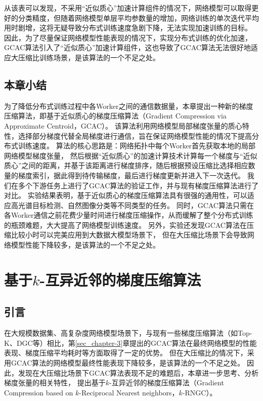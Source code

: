 \documentclass{xdupgthesis}
\begin{document}
从该表可以发现，不采用“近似质心”加速计算组件的情况下，网络模型可以取得更好的分类精度，但随着网络模型单层平均参数量的增加，网络训练的单次迭代平均用时剧增，这将无疑导致分布式训练速度急剧下降，无法实现加速训练的目标。
因此，为了尽量保证网络模型性能表现的情况下，实现分布式训练的优化加速，GCAC算法引入了“近似质心”加速计算组件，这也导致了GCAC算法无法很好地适应大压缩比训练场景，是该算法的一个不足之处。


\section{本章小结}
\label{sec_Summary-3}
为了降低分布式训练过程中各Worker之间的通信数据量，本章提出一种新的梯度压缩算法，即基于近似质心的梯度压缩算法（Gradient Compression via Approximate Centroid，GCAC）。
该算法利用网络模型局部梯度张量的质心特性，选择部分梯度代替全局梯度进行通信，旨在保证网络模型性能的情况下提高分布式训练速度。
算法的核心思路是：网络拓扑中每个Worker首先获取本地的局部网络模型梯度张量，
然后根据“近似质心”的加速计算技术计算每一个梯度与“近似质心”之间的距离，并基于该距离进行梯度排序，随后根据预设压缩比选择相应数量的梯度索引，据此得到待传输梯度，最后进行梯度更新并进入下一次迭代。
我们在多个下游任务上进行了GCAC算法的验证工作，并与现有梯度压缩算法进行了对比。
实验结果表明，基于近似质心的梯度压缩算法具有很强的通用性，可以适应高光谱目标检测、自然图像分类等不同类型的任务。
同时，GCAC算法只需在各Worker通信之前花费少量时间进行梯度压缩操作，从而缓解了整个分布式训练的瓶颈难题，大大提高了网络模型训练速度。
另外，实验还发现GCAC算法在压缩比较小时可以完美应用到大数据大模型场景下，
但在大压缩比场景下会导致网络模型性能下降较多，是该算法的一个不足之处。



\chapter{基于\texorpdfstring{$k$}.-互异近邻的梯度压缩算法}
\section{引言}
在大规模数据集、高复杂度网络模型场景下，与现有一些梯度压缩算法（如Top-K、DGC等）相比，第\ref{sec_chapter-3}章提出的GCAC算法在最终网络模型的性能表现、梯度压缩平均耗时等方面取得了一定的优势。
但在大压缩比的情况下，采用GCAC算法的网络模型最终性能表现下降较多，是该算法的一个不足之处。
因此，发现在大压缩比场景下GCAC算法表现不足的难题后，本章进一步思考、分析梯度张量的相关特性，
提出基于$k$-互异近邻的梯度压缩算法（Gradient Compression based on $k$-Reciprocal Nearest neighbors，$k$-RNGC）。
\end{document}
